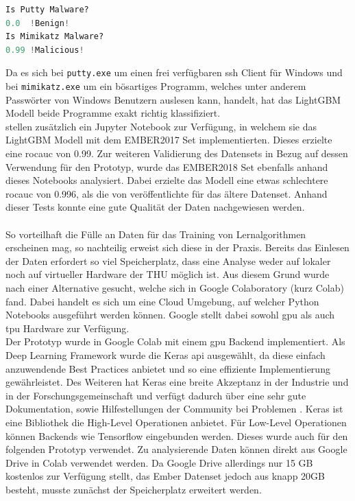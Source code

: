 \documentclass[
    12pt, %
    DIV10,
    ngerman, %
    a4paper, %
    oneside, %
    titlepage, %
    parskip=half, %
    headings=normal, %
    listof=totoc, %
    bibliography=totoc, %
    index=totoc, %
    captions=tableheading, %
    final %
]{scrreprt}
\begin{document}
\begin{lstlisting}[language=Python, caption=Ergebnis Python Testskript]
Is Putty Malware?
0.0  !Benign!
Is Mimikatz Malware?
0.99 !Malicious!
\end{lstlisting}
Da es sich bei \texttt{putty.exe} um einen frei verfügbaren \ac{ssh} Client für Windows und bei \texttt{mimikatz.exe} um ein bösartiges Programm, welches unter anderem Passwörter von Windows Benutzern auslesen kann, handelt, hat das LightGBM Modell beide Programme exakt richtig klassifiziert.\\
\textcite{anderson2018ember} stellen zusätzlich ein Jupyter Notebook zur Verfügung, in welchem sie das  LightGBM Modell mit dem EMBER2017 Set implementierten. Dieses erzielte eine \ac{rocauc} von 0.99. Zur weiteren Validierung des Datensets in Bezug auf dessen Verwendung für den Prototyp, wurde das EMBER2018 Set ebenfalls anhand dieses Notebooks analysiert. Dabei erzielte das Modell eine etwas schlechtere \ac{rocauc} von 0.996, als die von \textcite{anderson2018ember} veröffentlichte für das ältere Datenset. Anhand dieser Tests konnte eine gute Qualität der Daten nachgewiesen werden.\\\\
So vorteilhaft die Fülle an Daten für das Training von Lernalgorithmen erscheinen mag, so nachteilig erweist sich diese in der Praxis.
Bereits das Einlesen der Daten erfordert so viel Speicherplatz, dass eine Analyse weder auf lokaler noch auf virtueller Hardware der THU möglich ist. 
Aus diesem Grund wurde nach einer Alternative gesucht, welche sich in Google Colaboratory (kurz Colab) fand. Dabei handelt es sich um eine Cloud Umgebung, auf welcher Python Notebooks ausgeführt werden können. Google stellt dabei sowohl \ac{gpu} als auch \ac{tpu} Hardware zur Verfügung.\\
Der Prototyp wurde in Google Colab mit einem \ac{gpu} Backend implementiert. Als Deep Learning Framework wurde die Keras \ac{api} ausgewählt, da diese einfach anzuwendende Best Practices anbietet und so eine effiziente Implementierung gewährleistet. Des Weiteren hat Keras eine breite Akzeptanz in der Industrie und in der Forschungsgemeinschaft und verfügt dadurch über eine sehr gute Dokumentation, sowie Hilfestellungen der Community bei Problemen \parencite{Keras}. Keras ist eine Bibliothek die High-Level Operationen anbietet. Für Low-Level Operationen können Backends wie Tensorflow eingebunden werden. Dieses wurde auch für den folgenden Prototyp verwendet. Zu analysierende Daten können direkt aus Google Drive in Colab verwendet werden. Da Google Drive allerdings nur 15 GB kostenlos zur Verfügung stellt, das Ember Datenset jedoch aus knapp 20GB besteht, musste zunächst der Speicherplatz erweitert werden. 
\end{document}
